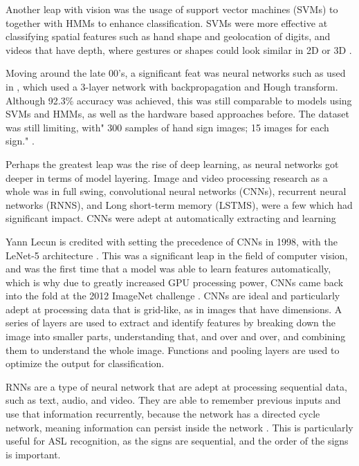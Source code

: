 Another leap with vision was the usage of support vector machines (SVMs) to together with HMMs to enhance classification. SVMs were more effective at classifying spatial features such as hand shape and geolocation of digits, and videos that have depth, where gestures or shapes could look similar in 2D or 3D \cite{voglerParallelHiddenMarkov1999a}.

Moving around the late 00's, a significant feat was neural networks such as used in \cite{munibAmericanSignLanguage2007b}, which used a 3-layer network with backpropagation and Hough transform. Although 92.3\% accuracy was achieved, this was still comparable to models using SVMs and HMMs, as well as the hardware based approaches before. The dataset was still limiting, with" 300 samples of hand sign images; 15 images for each sign." \cite{munibAmericanSignLanguage2007b}.

Perhaps the greatest leap was the rise of deep learning, as neural networks got deeper in terms of model layering. Image and video processing research as a whole was in full swing, convolutional neural networks (CNNs), recurrent neural networks (RNNS), and Long short-term memory (LSTMS), were a few which had significant impact. CNNs were adept at automatically extracting and learning


Yann Lecun is credited with setting the precedence of CNNs in 1998, with the LeNet-5 architecture \cite{lecunGradientbasedLearningApplied1998}. This was a significant leap in the field of computer vision, and was the first time that a model was able to learn features automatically, which is why due to greatly increased GPU processing power, CNNs came back into the fold at the 2012 ImageNet challenge \cite{krizhevskyImageNetClassificationDeep2012}. CNNs are ideal and particularly adept at processing data that is grid-like, as in images that have dimensions.  A series of layers are used to extract and identify features by breaking down the image into smaller parts, understanding that, and over and over, and combining them to understand the whole image. Functions and pooling layers are used to optimize the output for classification.

RNNs are a type of neural network that are adept at processing sequential data, such as text, audio, and video. They are able to remember previous inputs and use that information recurrently, because the network has a directed cycle network, meaning information can persist inside the network \cite{sherstinskyFundamentalsRecurrentNeural2020}. This is particularly useful for ASL recognition, as the signs are sequential, and the order of the signs is important.

